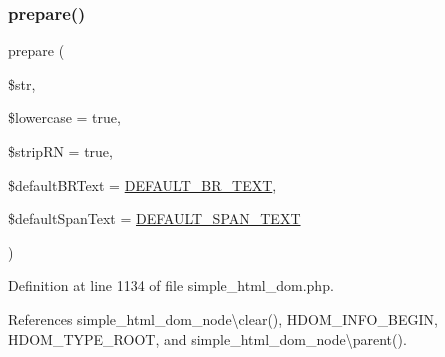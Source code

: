 \subsubsection{\texorpdfstring{prepare()}{prepare()}}
{\footnotesize\ttfamily prepare (\begin{DoxyParamCaption}\item[{}]{\$str,  }\item[{}]{\$lowercase = {\ttfamily true},  }\item[{}]{\$strip\+RN = {\ttfamily true},  }\item[{}]{\$default\+B\+R\+Text = {\ttfamily \hyperlink{simple__html__dom_8php_a898bdf60fe4d05c1c50013eed5e2c6e8}{D\+E\+F\+A\+U\+L\+T\+\_\+\+B\+R\+\_\+\+T\+E\+XT}},  }\item[{}]{\$default\+Span\+Text = {\ttfamily \hyperlink{simple__html__dom_8php_a30d58d7d3a53efc61f064b53a434bafe}{D\+E\+F\+A\+U\+L\+T\+\_\+\+S\+P\+A\+N\+\_\+\+T\+E\+XT}} }\end{DoxyParamCaption})\hspace{0.3cm}{\ttfamily [protected]}}



Definition at line 1134 of file simple\+\_\+html\+\_\+dom.\+php.



References simple\+\_\+html\+\_\+dom\+\_\+node\textbackslash{}clear(), H\+D\+O\+M\+\_\+\+I\+N\+F\+O\+\_\+\+B\+E\+G\+IN, H\+D\+O\+M\+\_\+\+T\+Y\+P\+E\+\_\+\+R\+O\+OT, and simple\+\_\+html\+\_\+dom\+\_\+node\textbackslash{}parent().


